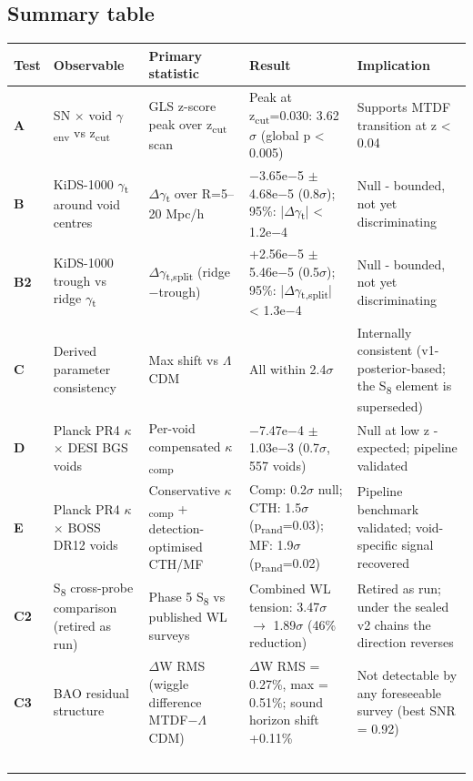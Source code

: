 \documentclass[11pt,a4paper]{article}
\begin{document}
\subsection{Summary table}
\begin{table}[H]
\centering
\footnotesize
\begin{tabularx}{\linewidth}{l>{\RaggedRight\arraybackslash}X>{\RaggedRight\arraybackslash}X>{\RaggedRight\arraybackslash}X>{\RaggedRight\arraybackslash}X}
\toprule
\textbf{Test} & \textbf{Observable} & \textbf{Primary statistic} & \textbf{Result} & \textbf{Implication} \tabularnewline
\midrule
\textbf{A} & SN $\times$ void $\gamma$\textsubscript{env} vs z\textsubscript{cut} & GLS z-score peak over z\textsubscript{cut} scan & Peak at z\textsubscript{cut}=0.030: 3.62$\sigma$ (global p < 0.005) & Supports MTDF transition at z < 0.04 \tabularnewline
\textbf{B} & KiDS-1000 $\gamma$\textsubscript{t} around void centres & $\Delta$$\gamma$\textsubscript{t} over R=5--20 Mpc/\allowbreak{}h & $-$3.65e$-$5 $\pm$ 4.68e$-$5 (0.8$\sigma$); 95\%: |$\Delta$$\gamma$\textsubscript{t}| < 1.2e$-$4 & Null  -  bounded, not yet discriminating \tabularnewline
\textbf{B2} & KiDS-1000 trough vs ridge $\gamma$\textsubscript{t} & $\Delta$$\gamma$\textsubscript{t,split} (ridge$-$trough) & +2.56e$-$5 $\pm$ 5.46e$-$5 (0.5$\sigma$); 95\%: |$\Delta$$\gamma$\textsubscript{t,split}| < 1.3e$-$4 & Null  -  bounded, not yet discriminating \tabularnewline
\textbf{C} & Derived parameter consistency & Max shift vs $\Lambda$CDM & All within 2.4$\sigma$ & Internally consistent (v1-posterior-based; the S\textsubscript{8} element is superseded) \tabularnewline
\textbf{D} & Planck PR4 $\kappa$ $\times$ DESI BGS voids & Per-void compensated $\kappa$\textsubscript{comp} & $-$7.47e$-$4 $\pm$ 1.03e$-$3 (0.7$\sigma$, 557 voids) & Null at low z  -  expected; pipeline validated \tabularnewline
\textbf{E} & Planck PR4 $\kappa$ $\times$ BOSS DR12 voids & Conservative $\kappa$\textsubscript{comp} + detection-optimised CTH/\allowbreak{}MF & Comp: 0.2$\sigma$ null; CTH: 1.5$\sigma$ (p\textsubscript{rand}=0.03); MF: 1.9$\sigma$ (p\textsubscript{rand}=0.02) & Pipeline benchmark validated; void-specific signal recovered \tabularnewline
\textbf{C2} & S\textsubscript{8} cross-probe comparison (retired as run) & Phase 5 S\textsubscript{8} vs published WL surveys & Combined WL tension: 3.47$\sigma$ $\rightarrow$ 1.89$\sigma$ (46\% reduction) & Retired as run; under the sealed v2 chains the direction reverses \tabularnewline
\textbf{C3} & BAO residual structure & $\Delta$W RMS (wiggle difference MTDF$-$$\Lambda$CDM) & $\Delta$W RMS = 0.27\%, max = 0.51\%; sound horizon shift +0.11\% & Not detectable by any foreseeable survey (best SNR = 0.92) \tabularnewline
$$
\end{tabularx}
\end{table}
\end{document}
